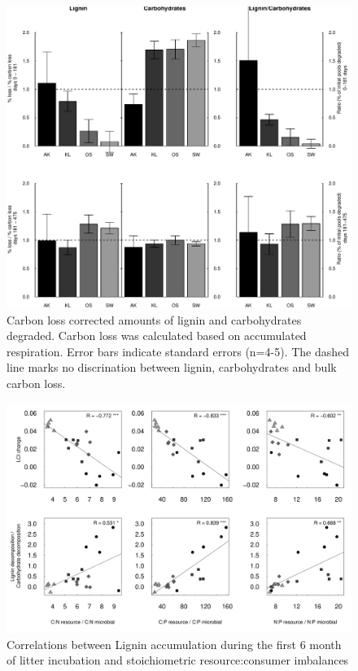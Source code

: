 \documentclass[authoryear,preprint,review,12pt]{elsarticle}
\begin{document}
\newpage
\begin{figure}[h!]
\vspace*{2mm}
\begin{center}
\includegraphics{sbb-degrdiff}
\end{center}
\caption{Carbon loss corrected amounts of lignin and carbohydrates degraded. Carbon loss was calculated based on accumulated respiration. Error bars indicate standard errors (n=4-5). The dashed line marks no discrination between lignin, carbohydrates and bulk carbon loss.}
\label{fig:degr}
\end{figure}

\newpage
\begin{figure}[h!]
\vspace*{2mm}
\begin{center}
\includegraphics{sbb-graphcorr}
\end{center}
\caption{Correlations between Lignin accumulation during the first 6 month of litter incubation and stoichiometric resource:consumer imbalances}
\label{fig:cor1}
\end{figure}
\end{document}
